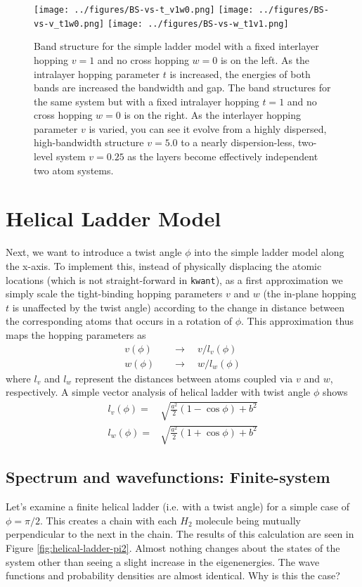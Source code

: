 \documentclass{article}
\begin{document}
\begin{figure}[h]
    \texttt{[image: ../figures/BS-vs-t\_v1w0.png]}
    \texttt{[image: ../figures/BS-vs-v\_t1w0.png]}
    \texttt{[image: ../figures/BS-vs-w\_t1v1.png]}
    \caption{Band structure for the simple ladder model with a fixed interlayer hopping $v = 1$ and no cross hopping $w = 0$ is on the left. As the intralayer hopping parameter $t$ is increased, the energies of both bands are increased the bandwidth and gap. The band structures for the same system but with a fixed intralayer hopping $t = 1$ and no cross hopping $w = 0$ is on the right. As the interlayer hopping parameter $v$ is varied, you can see it evolve from a highly dispersed, high-bandwidth structure $v = 5.0$ to a nearly dispersion-less, two-level system $v=0.25$ as the layers become effectively independent two atom systems.}
    \label{fig:my_label}
\end{figure}

\section{Helical Ladder Model}
Next, we want to introduce a twist angle $\phi$ into the simple ladder model along the x-axis. To implement this, instead of physically displacing the atomic locations (which is not straight-forward in \verb|kwant|), as a first approximation we simply scale the tight-binding hopping parameters $v$ and $w$ (the in-plane hopping $t$ is unaffected by the twist angle) according to the change in distance between the corresponding atoms that occurs in a rotation of $\phi$. This approximation thus maps the hopping parameters as
\begin{align}
    v(\phi) &\quad\longrightarrow\quad v/l_v(\phi) \\
    w(\phi) &\quad\longrightarrow\quad w/l_w(\phi)
\end{align}
where $l_v$ and $l_w$ represent the distances between atoms coupled via $v$ and $w$, respectively. A simple vector analysis of helical ladder with twist angle $\phi$ shows
\begin{align}
    l_v(\phi) =& \sqrt{\frac{a^2}{2}(1-\cos\phi) + b^2} \\
    l_w(\phi) =& \sqrt{\frac{a^2}{2}(1+\cos\phi) + b^2}
\end{align}

\subsection{Spectrum and wavefunctions: Finite-system}
Let's examine a finite helical ladder (i.e. with a twist angle) for a simple case of $\phi = \pi/2$. This creates a chain with each $H_2$ molecule being mutually perpendicular to the next in the chain. The results of this calculation are seen in Figure \ref{fig:helical-ladder-pi2}. Almost nothing changes about the states of the system other than seeing a slight increase in the eigenenergies. The wave functions and probability densities are almost identical. Why is this the case?
\end{document}

